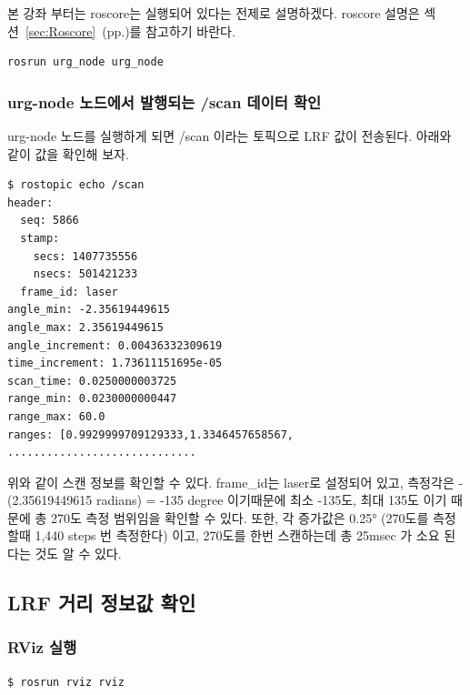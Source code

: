 본 강좌 부터는 roscore는 실행되어 있다는 전제로 설명하겠다. roscore 설명은 섹션~\ref{sec:Roscore}~(pp.\pageref{sec:Roscore})를 참고하기 바란다.

\begin{lstlisting}[language=ROS]
rosrun urg_node urg_node 
\end{lstlisting}

\subsubsection{urg-node 노드에서 발행되는 /scan 데이터 확인}

urg-node 노드를 실행하게 되면 /scan 이라는 토픽으로 LRF 값이 전송된다. 아래와 같이 값을 확인해 보자. 

\begin{lstlisting}[language=ROS]
$ rostopic echo /scan
header: 
  seq: 5866
  stamp: 
    secs: 1407735556
    nsecs: 501421233
  frame_id: laser
angle_min: -2.35619449615
angle_max: 2.35619449615
angle_increment: 0.00436332309619
time_increment: 1.73611151695e-05
scan_time: 0.0250000003725
range_min: 0.0230000000447
range_max: 60.0
ranges: [0.9929999709129333,1.3346457658567, .............................
\end{lstlisting}

위와 같이 스캔 정보를 확인할 수 있다. frame\_id는 laser로 설정되어 있고, 측정각은 -(2.35619449615 radians) = -135 degree 이기때문에 최소 -135도, 최대 135도 이기 때문에 총 270도 측정 범위임을 확인할 수 있다. 또한, 각 증가값은 0.25° (270도를 측정할때 1,440 steps 번 측정한다) 이고, 270도를 한번 스캔하는데 총 25msec 가 소요 된다는 것도 알 수 있다.

\subsection{LRF 거리 정보값 확인}

\subsubsection{RViz 실행}

\begin{lstlisting}[language=ROS]
$ rosrun rviz rviz
\end{lstlisting}

